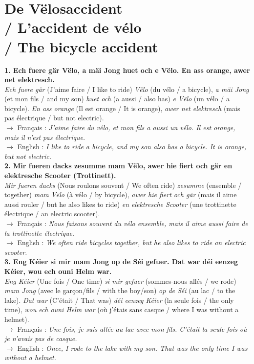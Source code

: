 \vspace{1cm}

\section[De Vëlosaccident / L'accident de vélo / The bicycle accident]{De Vëlosaccident \\/ L'accident de vélo \\/ The bicycle accident}

\noindent\textbf{1. Ech fuere gär Vëlo, a mäi Jong huet och e Vëlo. En ass orange, awer net elektresch.}\\
\textit{Ech fuere gär} (J'aime faire / I like to ride) \textit{Vëlo} (du vélo / a bicycle), \textit{a mäi Jong} (et mon fils / and my son) \textit{huet och} (a aussi / also has) \textit{e Vëlo} (un vélo / a bicycle). \textit{En ass orange} (Il est orange / It is orange), \textit{awer net elektresch} (mais pas électrique / but not electric).\\
$\rightarrow$ Français : \textit{J'aime faire du vélo, et mon fils a aussi un vélo. Il est orange, mais il n'est pas électrique.}\\
$\rightarrow$ English : \textit{I like to ride a bicycle, and my son also has a bicycle. It is orange, but not electric.}\\[0.5em]

\noindent\textbf{2. Mir fueren dacks zesumme mam Vëlo, awer hie fiert och gär en elektresche Scooter (Trottinett).}\\
\textit{Mir fueren dacks} (Nous roulons souvent / We often ride) \textit{zesumme} (ensemble / together) \textit{mam Vëlo} (à vélo / by bicycle), \textit{awer hie fiert och gär} (mais il aime aussi rouler / but he also likes to ride) \textit{en elektresche Scooter} (une trottinette électrique / an electric scooter).\\
$\rightarrow$ Français : \textit{Nous faisons souvent du vélo ensemble, mais il aime aussi faire de la trottinette électrique.}\\
$\rightarrow$ English : \textit{We often ride bicycles together, but he also likes to ride an electric scooter.}\\[0.5em]

\noindent\textbf{3. Eng Kéier si mir mam Jong op de Séi gefuer. Dat war déi eenzeg Kéier, wou ech ouni Helm war.}\\
\textit{Eng Kéier} (Une fois / One time) \textit{si mir gefuer} (sommes-nous allés / we rode) \textit{mam Jong} (avec le garçon/fils / with the boy/son) \textit{op de Séi} (au lac / to the lake). \textit{Dat war} (C'était / That was) \textit{déi eenzeg Kéier} (la seule fois / the only time), \textit{wou ech ouni Helm war} (où j'étais sans casque / where I was without a helmet).\\
$\rightarrow$ Français : \textit{Une fois, je suis allée au lac avec mon fils. C'était la seule fois où je n'avais pas de casque.}\\
$\rightarrow$ English : \textit{Once, I rode to the lake with my son. That was the only time I was without a helmet.}\\[0.5em]

